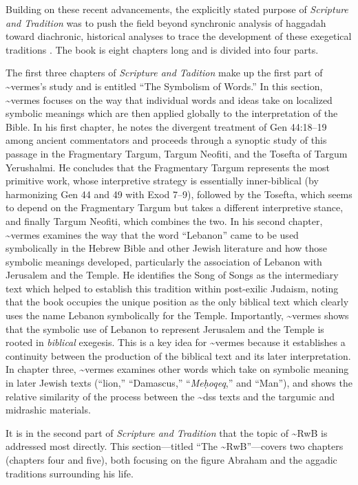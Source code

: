 Building on these recent advancements, the explicitly stated purpose of
\emph{Scripture and Tradition} was to push the field beyond synchronic
analysis of haggadah toward diachronic, historical analyses to trace the
development of these exegetical traditions \autocites[1]{vermes1961}[See
also][]{bloch1955_repr}. The book is eight chapters long and is divided
into four parts.

The first three chapters of \emph{Scripture and Tadition} make up the
first part of \textasciitilde{}vermes's study and is entitled ``The
Symbolism of Words.'' In this section, \textasciitilde{}vermes focuses
on the way that individual words and ideas take on localized symbolic
meanings which are then applied globally to the interpretation of the
Bible. In his first chapter, he notes the divergent treatment of Gen
44:18--19 among ancient commentators and proceeds through a synoptic
study of this passage in the Fragmentary Targum, Targum Neofiti, and the
Tosefta of Targum Yerushalmi. He concludes that the Fragmentary Targum
represents the most primitive work, whose interpretive strategy is
essentially inner-biblical (by harmonizing Gen 44 and 49 with Exod
7--9), followed by the Tosefta, which seems to depend on the Fragmentary
Targum but takes a different interpretive stance, and finally Targum
Neofiti, which combines the two. In his second chapter,
\textasciitilde{}vermes examines the way that the word ``Lebanon'' came
to be used symbolically in the Hebrew Bible and other Jewish literature
and how those symbolic meanings developed, particularly the association
of Lebanon with Jerusalem and the Temple. He identifies the Song of
Songs as the intermediary text which helped to establish this tradition
within post-exilic Judaism, noting that the book occupies the unique
position as the only biblical text which clearly uses the name Lebanon
symbolically for the Temple. Importantly, \textasciitilde{}vermes shows
that the symbolic use of Lebanon to represent Jerusalem and the Temple
is rooted in \emph{biblical} exegesis. This is a key idea for
\textasciitilde{}vermes because it establishes a continuity between the
production of the biblical text and its later interpretation. In chapter
three, \textasciitilde{}vermes examines other words which take on
symbolic meaning in later Jewish texts (``lion,'' ``Damascus,''
``\emph{Meḥoqeq},'' and ``Man''), and shows the relative similarity of
the process between the \textasciitilde{}dss texts and the targumic and
midrashic materials.

It is in the second part of \emph{Scripture and Tradition} that the
topic of \textasciitilde{}RwB is addressed most directly. This
section---titled ``The \textasciitilde{}RwB''---covers two chapters
(chapters four and five), both focusing on the figure Abraham and the
aggadic traditions surrounding his life.

